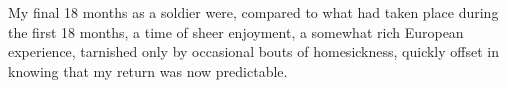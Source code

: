 \documentclass[../m3y]{subfiles}
\begin{document}
My final 18 months as a soldier were, compared to what had taken place during the first 18 months, a time of sheer enjoyment, a somewhat rich European experience, tarnished only by occasional bouts of homesickness, quickly offset in knowing that my return was now predictable.
\end{document}
